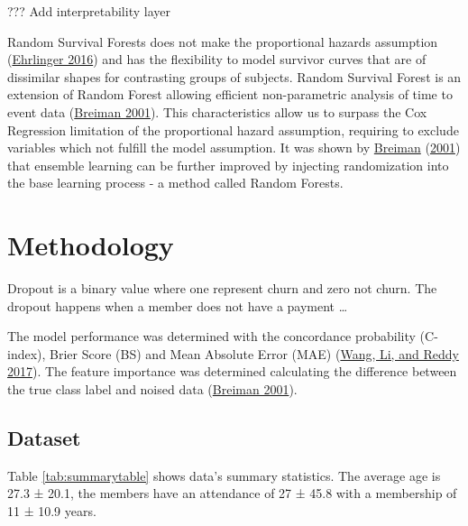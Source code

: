 \documentclass[
  12pt,
]{article}
\begin{document}
??? Add interpretability layer

Random Survival Forests does not make the proportional hazards assumption
(\protect\hyperlink{ref-Ehrlinger_2016}{Ehrlinger 2016}) and has the flexibility to model survivor curves that are of
dissimilar shapes for contrasting groups of subjects. Random Survival Forest is
an extension of Random Forest allowing efficient non-parametric analysis of time
to event data (\protect\hyperlink{ref-Breiman_2001}{Breiman 2001}). This characteristics allow us to surpass the Cox
Regression limitation of the proportional hazard assumption, requiring to
exclude variables which not fulfill the model assumption. It was shown by
\protect\hyperlink{ref-Breiman_2001}{Breiman} (\protect\hyperlink{ref-Breiman_2001}{2001}) that ensemble learning can be further improved by injecting
randomization into the base learning process - a method called Random Forests.

\hypertarget{methodology}{%
\section{Methodology}\label{methodology}}

Dropout is a binary value where one represent churn and zero not churn. The
dropout happens when a member does not have a payment \ldots{}

The model performance was determined with the concordance probability (C-index),
Brier Score (BS) and Mean Absolute Error (MAE) (\protect\hyperlink{ref-wangmachine2017}{Wang, Li, and Reddy 2017}). The feature
importance was determined calculating the difference between the true class
label and noised data (\protect\hyperlink{ref-Breiman_2001}{Breiman 2001}).

\hypertarget{dataset}{%
\subsection{Dataset}\label{dataset}}

Table \ref{tab:summarytable} shows data's summary statistics. The average age
is 27.3 ±
20.1, the members have an attendance of
27 ±
45.8 with a membership of
11 ±
10.9 years.
\end{document}
